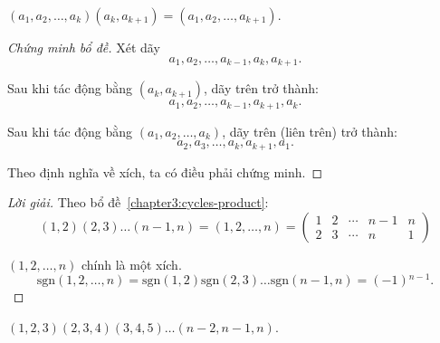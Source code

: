 \documentclass[class=linearalgebra,crop=false]{standalone}
\newcommand{\sgn}[1]{\text{sgn}\left({#1}\right)}
\begin{document}
\begin{lemma}\label{chapter3:cycles-product}
    $(a_{1}, a_{2}, \ldots, a_{k})(a_{k},a_{k+1}) = (a_{1},a_{2},\ldots, a_{k+1})$.
\end{lemma}

\begin{proof}[Chứng minh bổ đề]
    \par Xét dãy
        \[
            a_{1}, a_{2}, \ldots, a_{k-1}, a_{k}, a_{k+1}.
        \]
    \par Sau khi tác động bằng $(a_{k},a_{k+1})$, dãy trên trở thành:
        \[
            a_{1}, a_{2}, \ldots, a_{k-1}, a_{k+1}, a_{k}.
        \]
    \par Sau khi tác động bằng $(a_{1}, a_{2}, \ldots, a_{k})$, dãy trên (liên trên) trở thành:
        \[
            a_{2}, a_{3}, \ldots, a_{k}, a_{k+1}, a_{1}.
        \]
    \par Theo định nghĩa về xích, ta có điều phải chứng minh.
\end{proof}

\begin{proof}[Lời giải]
    \par Theo bổ đề~\ref{chapter3:cycles-product}:
        \[
            (1,2)(2,3)\ldots (n-1,n) = (1,2,\ldots,n)
            =
            \begin{pmatrix}
                1 & 2 & \cdots & n-1 & n \\
                2 & 3 & \cdots & n   & 1
            \end{pmatrix}
        \]
    \par $(1,2,\ldots, n)$ chính là một xích.
        \[
            \sgn{1,2,\ldots,n} = \sgn{1,2}\sgn{2,3}\ldots\sgn{n-1,n} = (-1){}^{n-1}.
        \]
\end{proof}

\begin{exercise}
    $(1,2,3)(2,3,4)(3,4,5)\ldots (n-2,n-1,n)$.
\end{exercise}
\end{document}

